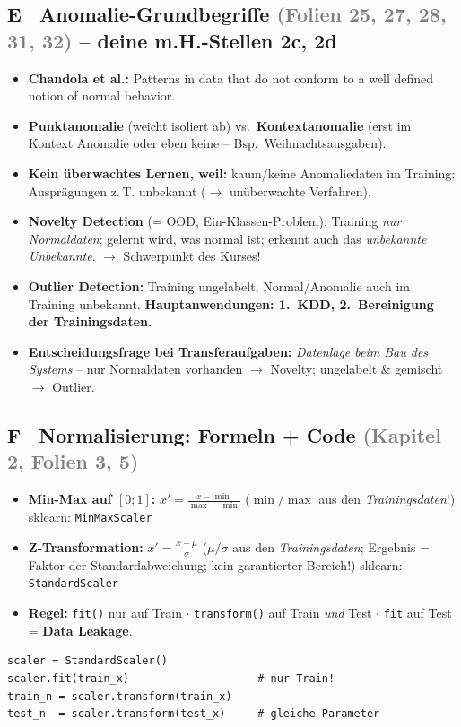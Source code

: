 \documentclass[10pt,a4paper]{article}
\newcommand{\folie}[1]{\textcolor{gray}{\footnotesize(#1)}}
\begin{document}
\subsection*{E \ Anomalie-Grundbegriffe \folie{Folien 25, 27, 28, 31, 32} -- deine m.H.-Stellen 2c, 2d}
\begin{itemize}
  \item \textbf{Chandola et al.:} \glqq Patterns in data that do not conform to a well defined notion of normal behavior.\grqq
  \item \textbf{Punktanomalie} (weicht isoliert ab) vs.\ \textbf{Kontextanomalie} (erst im Kontext Anomalie oder eben keine -- Bsp.\ Weihnachtsausgaben).
  \item \textbf{Kein überwachtes Lernen, weil:} kaum/keine Anomaliedaten im Training; Ausprägungen z.\,T. unbekannt ($\to$ unüberwachte Verfahren).
  \item \textbf{Novelty Detection} (= OOD, Ein-Klassen-Problem): Training \emph{nur Normaldaten}; gelernt wird, was normal ist; erkennt auch das \emph{unbekannte Unbekannte}. $\to$ Schwerpunkt des Kurses!
  \item \textbf{Outlier Detection:} Training ungelabelt, Normal/Anomalie auch im Training unbekannt. \textbf{Hauptanwendungen: 1.\ KDD, 2.\ Bereinigung der Trainingsdaten.}
  \item \textbf{Entscheidungsfrage bei Transferaufgaben:} \emph{Datenlage beim Bau des Systems} -- nur Normaldaten vorhanden $\to$ Novelty; ungelabelt \& gemischt $\to$ Outlier.
\end{itemize}

\subsection*{F \ Normalisierung: Formeln + Code \folie{Kapitel 2, Folien 3, 5}}
\begin{itemize}
  \item \textbf{Min-Max auf $[0;1]$:} $x' = \frac{x - \min}{\max - \min}$ \quad ($\min/\max$ aus den \emph{Trainingsdaten}!) \quad sklearn: \texttt{MinMaxScaler}
  \item \textbf{Z-Transformation:} $x' = \frac{x - \mu}{\sigma}$ \quad ($\mu/\sigma$ aus den \emph{Trainingsdaten}; Ergebnis = Faktor der Standardabweichung; kein garantierter Bereich!) \quad sklearn: \texttt{StandardScaler}
  \item \textbf{Regel:} \texttt{fit()} nur auf Train $\cdot$ \texttt{transform()} auf Train \emph{und} Test $\cdot$ \texttt{fit} auf Test = \textbf{Data Leakage}.
\end{itemize}
\begin{lstlisting}
scaler = StandardScaler()
scaler.fit(train_x)                    # nur Train!
train_n = scaler.transform(train_x)
test_n  = scaler.transform(test_x)     # gleiche Parameter
\end{lstlisting}
\end{document}
